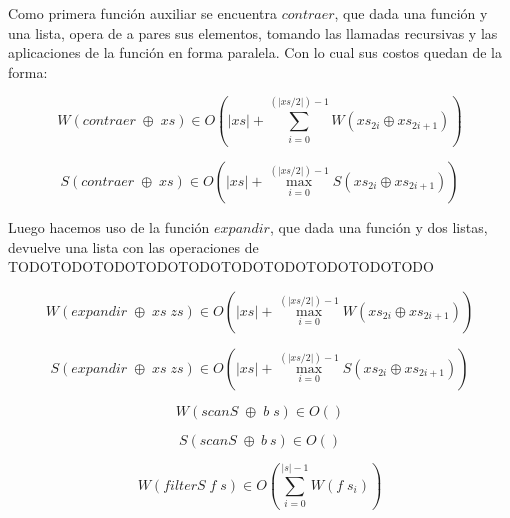 \documentclass[a4paper,10pt]{article}
\begin{document}
    Como primera función auxiliar se encuentra $contraer$, que dada una función y
una lista, opera de a pares sus elementos, tomando las llamadas recursivas y las 
aplicaciones de la función en forma paralela. Con lo cual sus costos quedan de la 
forma:

\begin{equation*}
    W \left( contraer \;\oplus \;xs \right) \in
    O \left( \vert xs \vert + \sum_{i=0}^{(\vert xs / 2 \vert) - 1} W \left( xs_{2i} \oplus xs_{2i+1} \right) \right)
\end{equation*}

\begin{equation*}
    S \left( contraer \;\oplus \;xs \right) \in
    O \left( \vert xs \vert + \max_{i=0}^{(\vert xs / 2 \vert) - 1} S \left( xs_{2i} \oplus xs_{2i+1} \right) \right)
\end{equation*}

\smallskip

    Luego hacemos uso de la función $expandir$, que dada una función y dos listas,
devuelve una lista con las operaciones de TODOTODOTODOTODOTODOTODOTODOTODOTODOTODO

\begin{equation*}
    W \left( expandir \;\oplus \;xs \;zs \right) \in
    O \left( \vert xs \vert + \max_{i=0}^{(\vert xs / 2 \vert) - 1} W \left( xs_{2i} \oplus xs_{2i+1} \right) \right)
\end{equation*}

\begin{equation*}
    S \left( expandir \;\oplus \;xs \;zs \right) \in
    O \left( \vert xs \vert + \max_{i=0}^{(\vert xs / 2 \vert) - 1} S \left( xs_{2i} \oplus xs_{2i+1} \right) \right)
\end{equation*}




\begin{equation*}
    W \left( scanS\; \oplus \;b \;s \right) \in
    O \left( \right) 
\end{equation*}

\begin{equation*}
    S \left( scanS\; \oplus \:b \:s \right) \in
    O \left( \right)
\end{equation*}

\begin{equation*}
    W \left( filterS\; f \; s \right) \in
    O \left( \sum_{i=0}^{\vert s \vert -1} W \left( f \; s_i \right) \right)
\end{equation*}
\end{document}
